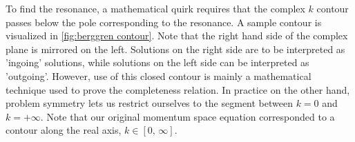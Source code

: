 \documentclass[../main/report.tex]{subfiles}
\begin{document}


To find the resonance, a mathematical quirk requires that the complex $k$ contour passes below the pole corresponding to the resonance. 
A sample contour is visualized in \cref{fig:berggren contour}. Note that the right hand side of the complex plane is mirrored on the left. 
Solutions on the right side are to be interpreted as 'ingoing' solutions, while solutions on the left side can be interpreted as 'outgoing'. 
However, use of this closed contour is mainly a mathematical technique used to prove the completeness relation. 
In practice on the other hand, problem symmetry lets us restrict ourselves to the segment between $k=0$ and $k=+\infty$. 
Note that our original momentum space equation corresponded to a contour along the real axis, $k \in [0,\, \infty]$.


\end{document}
